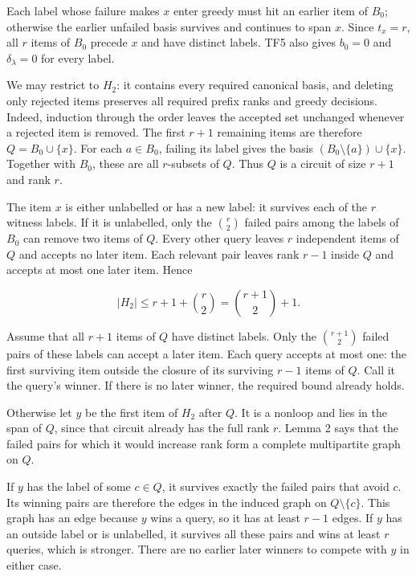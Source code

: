 Each label whose failure makes \(x\) enter greedy must hit an earlier item of \(B_0\); otherwise the earlier unfailed basis survives and continues to span \(x\). Since \(t_x=r\), all \(r\) items of \(B_0\) precede \(x\) and have distinct labels. TF5 also gives \(b_0=0\) and \(\delta_\lambda=0\) for every label.

We may restrict to \(H_2\): it contains every required canonical basis, and deleting only rejected items preserves all required prefix ranks and greedy decisions. Indeed, induction through the order leaves the accepted set unchanged whenever a rejected item is removed. The first \(r+1\) remaining items are therefore \(Q=B_0\cup\{x\}\). For each \(a\in B_0\), failing its label gives the basis \((B_0\setminus\{a\})\cup\{x\}\). Together with \(B_0\), these are all \(r\)-subsets of \(Q\). Thus \(Q\) is a circuit of size \(r+1\) and rank \(r\).

The item \(x\) is either unlabelled or has a new label: it survives each of the \(r\) witness labels. If it is unlabelled, only the \(\binom r2\) failed pairs among the labels of \(B_0\) can remove two items of \(Q\). Every other query leaves \(r\) independent items of \(Q\) and accepts no later item. Each relevant pair leaves rank \(r-1\) inside \(Q\) and accepts at most one later item. Hence

\[
|H_2|\le r+1+\binom r2=\binom{r+1}{2}+1.
\]

Assume that all \(r+1\) items of \(Q\) have distinct labels. Only the \(\binom{r+1}{2}\) failed pairs of these labels can accept a later item. Each query accepts at most one: the first surviving item outside the closure of its surviving \(r-1\) items of \(Q\). Call it the query's winner. If there is no later winner, the required bound already holds.

Otherwise let \(y\) be the first item of \(H_2\) after \(Q\). It is a nonloop and lies in the span of \(Q\), since that circuit already has the full rank \(r\). Lemma 2 says that the failed pairs for which it would increase rank form a complete multipartite graph on \(Q\).

If \(y\) has the label of some \(c\in Q\), it survives exactly the failed pairs that avoid \(c\). Its winning pairs are therefore the edges in the induced graph on \(Q\setminus\{c\}\). This graph has an edge because \(y\) wins a query, so it has at least \(r-1\) edges. If \(y\) has an outside label or is unlabelled, it survives all these pairs and wins at least \(r\) queries, which is stronger. There are no earlier later winners to compete with \(y\) in either case.

